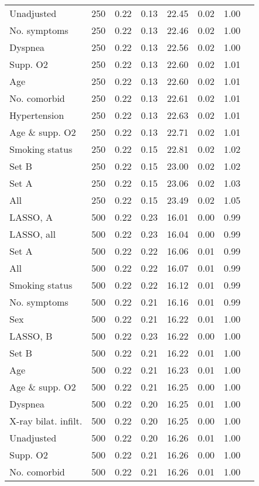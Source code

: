 \documentclass{article}
\begin{document}
{\begin{longtable}{lccccccc}
Unadjusted & 250 & 0.22 & 0.13 & 22.45 & 0.02 & 1.00\\
No. symptoms & 250 & 0.22 & 0.13 & 22.46 & 0.02 & 1.00\\
Dyspnea & 250 & 0.22 & 0.13 & 22.56 & 0.02 & 1.00\\
Supp. O2 & 250 & 0.22 & 0.13 & 22.60 & 0.02 & 1.01\\
Age & 250 & 0.22 & 0.13 & 22.60 & 0.02 & 1.01\\
No. comorbid & 250 & 0.22 & 0.13 & 22.61 & 0.02 & 1.01\\
Hypertension & 250 & 0.22 & 0.13 & 22.63 & 0.02 & 1.01\\
Age \& supp. O2 & 250 & 0.22 & 0.13 & 22.71 & 0.02 & 1.01\\
Smoking status & 250 & 0.22 & 0.15 & 22.81 & 0.02 & 1.02\\
Set B & 250 & 0.22 & 0.15 & 23.00 & 0.02 & 1.02\\
Set A & 250 & 0.22 & 0.15 & 23.06 & 0.02 & 1.03\\
All & 250 & 0.22 & 0.15 & 23.49 & 0.02 & 1.05\\ \midrule
LASSO, A & 500 & 0.22 & 0.23 & 16.01 & 0.00 & 0.99\\
LASSO, all & 500 & 0.22 & 0.23 & 16.04 & 0.00 & 0.99\\
Set A & 500 & 0.22 & 0.22 & 16.06 & 0.01 & 0.99\\
All & 500 & 0.22 & 0.22 & 16.07 & 0.01 & 0.99\\
Smoking status & 500 & 0.22 & 0.22 & 16.12 & 0.01 & 0.99\\
No. symptoms & 500 & 0.22 & 0.21 & 16.16 & 0.01 & 0.99\\
Sex & 500 & 0.22 & 0.21 & 16.22 & 0.01 & 1.00\\
LASSO, B & 500 & 0.22 & 0.23 & 16.22 & 0.00 & 1.00\\
Set B & 500 & 0.22 & 0.21 & 16.22 & 0.01 & 1.00\\
Age & 500 & 0.22 & 0.21 & 16.23 & 0.01 & 1.00\\
Age \& supp. O2 & 500 & 0.22 & 0.21 & 16.25 & 0.00 & 1.00\\
Dyspnea & 500 & 0.22 & 0.20 & 16.25 & 0.01 & 1.00\\
X-ray bilat. infilt. & 500 & 0.22 & 0.20 & 16.25 & 0.00 & 1.00\\
Unadjusted & 500 & 0.22 & 0.20 & 16.26 & 0.01 & 1.00\\
Supp. O2 & 500 & 0.22 & 0.21 & 16.26 & 0.00 & 1.00\\
No. comorbid & 500 & 0.22 & 0.21 & 16.26 & 0.01 & 1.00\\

\end{longtable}}
\end{document}
